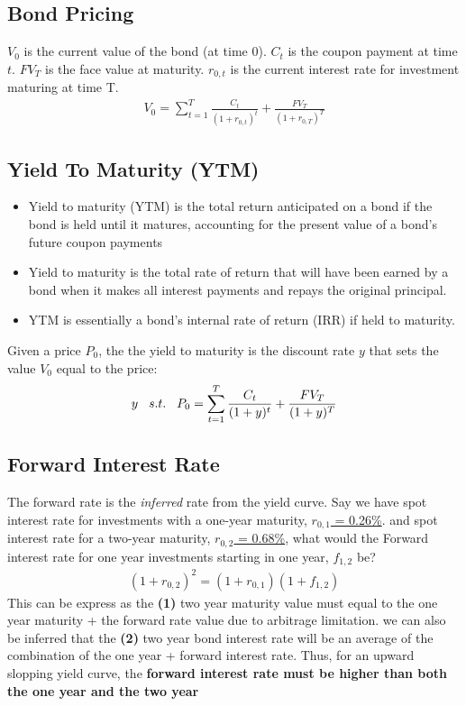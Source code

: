 \begin{multicols}{2}
    

\subsection{Bond Pricing}
$V_0$ is the current value of the bond (at time 0). $C_t$ is the coupon payment at time $t$. $FV_T$ is the face value at maturity. $r_{0,t}$ is the current interest rate for investment maturing at time T. 
\begin{gather*}
    V_0 = \sum_{t=1}^{T}\frac{C_t}{(1+r_{0,t})^t}+\frac{FV_T}{(1+r_{0,T})^T}
\end{gather*}

\subsection{Yield To Maturity (YTM)}
\begin{itemize}
    \item Yield to maturity (YTM) is the total return anticipated on a bond if the bond is held until it matures, accounting for the present value of a bond's future coupon payments
    \item Yield to maturity is the total rate of return that will have been earned by a bond when it makes all interest payments and repays the original principal.
    \item YTM is essentially a bond's internal rate of return (IRR) if held to maturity.
\end{itemize}
Given a price $P_0$, the the yield to maturity is the discount rate $y$ that sets the value $V_0$ equal to the price:
\begin{gather*}
    y\hspace*{0.3cm}s.t.\hspace*{0.3cm}P_0 = \sum_{t=1}^{T}\frac{C_t}{(1+y)^t}+\frac{FV_T}{(1+y)^T}
\end{gather*}
 
\subsection{Forward Interest Rate}
The forward rate is the \textit{inferred} rate from the yield curve. Say we have spot interest rate for investments with a one-year maturity, \underline{$r_{0,1}$ = 0.26\%}. and spot interest rate for a two-year maturity, \underline{$r_{0,2}$ = 0.68\%}, what would the Forward interest rate for one year investments starting in one year, $f_{1,2}$ be?
\begin{gather*}
    (1+r_{0,2})^2 = (1+r_{0,1})(1+f_{1,2})
\end{gather*}
This can be express as the \textbf{(1)} two year maturity value must equal to the one year maturity + the forward rate value due to arbitrage limitation. we can also be inferred that the \textbf{(2)} two year bond interest rate will be an average of the combination of the one year + forward interest rate. Thus, for an upward slopping yield curve, the \textbf{forward interest rate must be higher than both the one year and the two year} 


\end{multicols}
